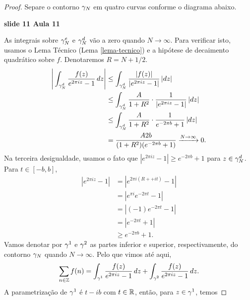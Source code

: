 \begin{proof}
            Separe o contorno $\gamma_N$ em quatro curvas conforme o diagrama abaixo. 
            \begin{center}
                {\bf slide 11 Aula 11}
            \end{center}
            As integrais sobre
            $\gamma_N^e$ e $\gamma_N^d$ vão a zero quando $N \to \infty$. Para verificar isto, usamos o 
            Lema Técnico (Lema \ref{lema-tecnico}) e a hipótese de decaimento quadrático sobre $f$. 
            Denotaremos $R = N + 1/2$.
            \begin{align*}
                \Bigg |\int_{\gamma_N^d} \frac{f(z)}{e^{2 \pi i z} - 1}\,dz\Bigg| 
                &\leq \int_{\gamma_N^d} \frac{|f(z)|}{|e^{2 \pi i z} - 1|}\,|dz| \\
                &\leq \int_{\gamma_N^d} \frac{A}{1 + R^2}\cdot\frac{1}{|e^{2 \pi i z} - 1|}\,|dz| \\
                &\leq \int_{\gamma_N^d} \frac{A}{1 + R^2}\cdot\frac{1}{e^{-2\pi b} + 1}\,|dz| \\
                & = \frac{A2b}{(1 + R^2)(e^{-2\pi b} + 1)} \xrightarrow{N \to \infty} 0.
            \end{align*}
            Na terceira desigualdade, usamos o fato que $|e^{2\pi i z} - 1| \geq e^{-2 \pi b} + 1$ 
            para $z \in \gamma_N^d$. Para $t \in [-b,b]$,
            \begin{align*}
                |e^{2 \pi i z} - 1| &= |e^{2 \pi i(R+ + i t)} - 1| \\
                &= |e^{\pi i}e^{-2\pi t} - 1| \\
                & = |(-1)e^{-2\pi t} - 1| \\
                &= |e^{-2\pi t} + 1| \\
                &\geq e^{-2\pi b} + 1.
            \end{align*}
            Vamos denotar por $\gamma^1$ e $\gamma^2$ as partes inferior e superior, respectivamente, 
            do contorno $\gamma_N$ quando $N \to \infty$. Pelo que vimos até aqui,
            \begin{equation*}
                \sum_{n \in \mathbb{Z}}f(n) = \int_{\gamma^1}\frac{f(z)}{e^{2\pi i z} - 1}\,dz 
                                    + \int_{\gamma^2}\frac{f(z)}{e^{2\pi i z} - 1}\,dz.
            \end{equation*}
            A parametrização de $\gamma^1$ é $t - ib$ com $t \in \mathbb{R}$, então, para $z \in \gamma^1$, 
            temos 

\end{proof}
